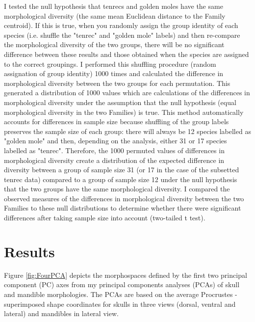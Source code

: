 	I tested the null hypothesis that tenrecs and golden moles have the same morphological diversity (the same mean Euclidean distance to the Family centroid). If this is true, when you randomly assign the group identity of each species (i.e. shuffle the "tenrec" and "golden mole" labels) and then re-compare the morphological diversity of the two groups, there will be no significant difference between these results and those obtained when the species are assigned to the correct groupings. 
	I performed this shuffling procedure (random assignation of group identity) 1000 times and calculated the difference in morphological diversity between the two groups for each permutation. This generated a distribution of 1000 values which are calculations of the differences in morphological diversity under the assumption that the null hypothesis (equal morphological diversity in the two Families) is true. This method automatically accounts for differences in sample size because shuffling of the group labels preserves the sample size of each group: there will always be 12 species labelled as "golden mole" and then, depending on the analysis, either 31 or 17 species labelled as "tenrec". Therefore, the 1000 permuted values of differences in morphological diversity create a distribution of the expected difference in diversity between a group of sample size 31 (or 17 in the case of the subsetted tenrec data) compared to a group of sample size 12 under the null hypothesis that the two groups have the same morphological diversity. I compared the observed measures of the differences in morphological diversity between the two Families to these null distributions to determine whether there were significant differences after taking sample size into account (two-tailed t test).
	

\section{Results}
\label{sect:results}

	Figure \ref{fig:FourPCA} depicts the morphospaces defined by the first two principal component (PC) axes from my principal components analyses (PCAs) of skull and mandible morphologies. The PCAs are based on the average Procrustes -\\superimposed shape coordinates for skulls in three views (dorsal, ventral and lateral) and mandibles in lateral view.

